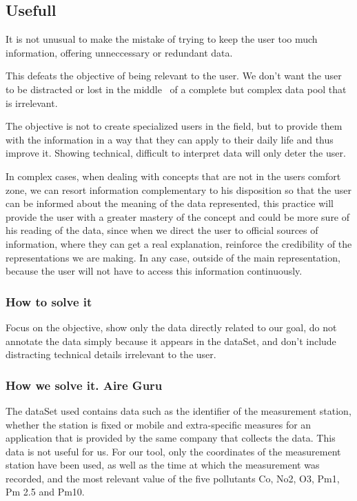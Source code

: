 \subsection{Usefull}
It is not unusual to make the mistake of trying to keep the user too much information, offering unneccessary or redundant data.
 
This defeats the objective of being relevant to the user. We don't want the user to be distracted or lost in the middle
 of a complete but complex data pool that is irrelevant.

The objective is not to create specialized users in the field, but to provide them with the
information in a way that they can apply to their daily life and thus improve it. Showing
technical, difficult to interpret data will only deter the user. 

In complex cases, when dealing with concepts that are not in the users comfort zone, we can resort information
complementary to his disposition so that the user can be informed about the meaning of the data
represented, this practice will provide the user with a greater mastery of the concept and could be more
sure of his reading of the data, since when we direct the user to official sources of information, where they can
get a real explanation, reinforce the credibility of the representations we are making. In any case,
outside of the main representation, because the user will not have to access this information continuously.

\subsubsection{How to solve it} 
Focus on the objective, show only the data directly related to our goal, do not annotate the data
simply because it appears in the dataSet, and don't include distracting technical details irrelevant to the user.

\subsubsection{How we solve it. Aire Guru} 

The dataSet used contains data such as the identifier of the measurement station, whether the station is fixed or mobile
and extra-specific measures for an application that is provided by the same company that collects the data. This data is not useful for us.
For our tool, only the coordinates of the measurement station have been used, as well as the time at which the measurement was recorded, and the most relevant value of the five pollutants Co, No2, O3, Pm1, Pm 2.5 and Pm10.

